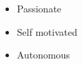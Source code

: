 
\twocolumnsection
{
\begin{skills}
\end{skills}}
{
\vspace{1em}
\begin{itemize}
	\item Passionate
	\item Self motivated                    
    \item Autonomous
\end{itemize}
}

